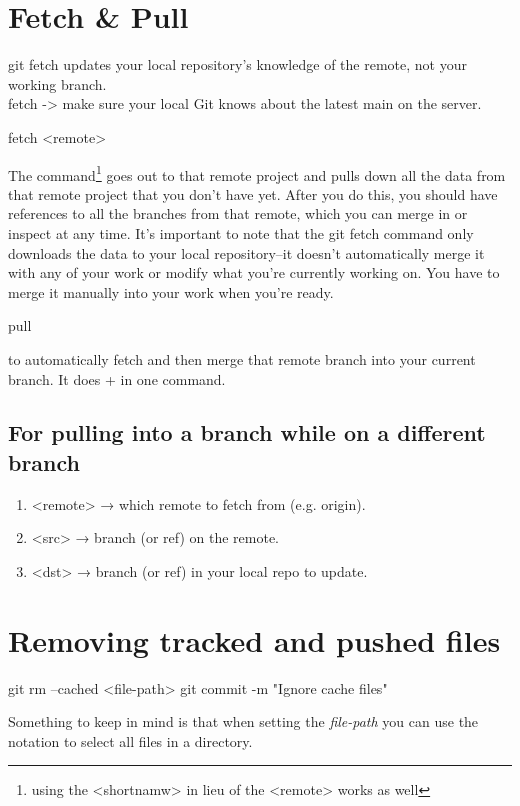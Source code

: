 \section{Fetch \& Pull}
git fetch updates your local repository's knowledge of the remote, not your working branch.\\
fetch -> make sure your local Git knows about the latest main on the server.\\
\begin{gitBashBox}
fetch <remote>
\end{gitBashBox}
\noindent The command\footnote{using the <shortnamw> in lieu of the <remote> works as well} goes out to that remote project and pulls down all the data from that remote project that you 
don't have yet. After you do this, you should have references to all the branches from that remote, which you can merge in or inspect at any time.
\newline\noindent It's important to note that the git fetch command only downloads the data to your local repository--it doesn't automatically merge it with any of your work or modify what you're currently working on. You have to merge it manually into your work when you're ready.
\begin{gitBashBox}
pull
\end{gitBashBox}
\noindent to automatically fetch and then merge that remote branch into your current branch. It does  +  in one command.


\subsection {For pulling into a branch while on a different branch}
\begin{enumerate}
    \item <remote> → which remote to fetch from (e.g. origin).
    \item <src> → branch (or ref) on the remote.
    \item <dst> → branch (or ref) in your local repo to update.
\end{enumerate}

\section{Removing tracked and pushed files}
\begin{gitBashBox}
git rm --cached <file-path>
git commit -m "Ignore cache files"  
\end{gitBashBox}
\noindent Something to keep in mind is that when setting the \textit{file-path} you can use the \cmdinline{/*} notation to select all files in a directory.


